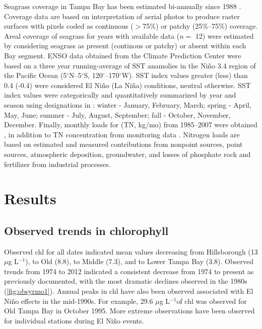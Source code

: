 \documentclass[letterpaper,12pt,oneside]{article}\usepackage[]{graphicx}\usepackage[]{color}
\newcommand{\mugl}{$\mu$g L$^{-1}$}
\begin{document}
Seagrass coverage in Tampa Bay has been estimated bi-annually since 1988 \citep{Tomasko05}.  Coverage data are based on interpretation of aerial photos to produce raster surfaces with pixels coded as continuous ($>$75\%) or patchy (25\%--75\%) coverage.  Areal coverage of seagrass for years with available data ($n=$ 12) were estimated by considering seagrass as present (continous or patchy) or absent within each Bay segment.  \ac{ENSO} data obtained from the Climate Prediction Center  were based on a three year running-average of \ac{SST} anamolies in the Ni\~{n}o 3.4 region of the Pacific Ocean (5$^{\circ}$N--5$^{\circ}$S, 120$^{\circ}$--170$^{\circ}$W).  \ac{SST} index values greater (less) than 0.4 (-0.4) were considered El Ni\~{n}o (La Ni\~{n}a) conditions, neutral otherwise.  \ac{SST} index values were categorically and quantitatively summarized by year and season using designations in \citet{Lipp01}: winter - January, February, March; spring - April, May, June; summer - July, August, September; fall - October, November, December.  Finally, monthly loads for  (\acs{TN}, kg/mo) from 1985--2007 were obtained \citep{Zarbock94,Pribble01,Poe05}, in addition to \ac{TN} concentration from monitoring data .  Nitrogen loads are based on estimated and measured contributions from nonpoint sources, point sources, atmospheric deposition, groundwater, and losses of phosphate rock and fertilizer from industrial processes.

\section{Results}

\subsection{Observed trends in chlorophyll}

Observed \ac{chl} for all dates indicated mean values decreasing from Hillsborough (13 \mugl), to Old (8.8), to Middle (7.3), and to Lower Tampa Bay (3.8).  Observed trends from 1974 to 2012 indicated a consistent decrease from 1974 to present as previously documented, with the most dramatic declines observed in the 1980s (\cref{fig:obsyrmo1}).  Annual peaks in \ac{chl} have also been observed associated with El Ni\~{n}o effects \citep{Greening06} in the mid-1990s.  For example, 29.6 \mugl of \ac{chl} was observed for Old Tampa Bay in October 1995.  More extreme observations have been observed for individual stations during El Ni\~{n}o events. 
\end{document}
